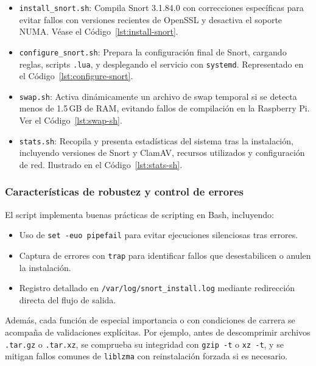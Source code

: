 \documentclass[11pt,a4paper,twoside]{report}
\begin{document}
\begin{itemize}
	\item \texttt{install\_snort.sh}: Compila Snort 3.1.84.0 con correcciones específicas para evitar fallos con versiones recientes de OpenSSL y desactiva el soporte NUMA.  
	Véase el Código~\ref{lst:install-snort}.
	
	\item \texttt{configure\_snort.sh}: Prepara la configuración final de Snort, cargando reglas, scripts \texttt{.lua}, y desplegando el servicio con \texttt{systemd}.  
	Representado en el Código~\ref{lst:configure-snort}.
	
	\item \texttt{swap.sh}: Activa dinámicamente un archivo de swap temporal si se detecta menos de 1.5\,GB de RAM, evitando fallos de compilación en la Raspberry Pi.  
	Ver el Código~\ref{lst:swap-sh}.
	
	\item \texttt{stats.sh}: Recopila y presenta estadísticas del sistema tras la instalación, incluyendo versiones de Snort y ClamAV, recursos utilizados y configuración de red.  
	Ilustrado en el Código~\ref{lst:stats-sh}.
\end{itemize}

\subsubsection{Características de robustez y control de errores}

El script implementa buenas prácticas de scripting en Bash, incluyendo:

\begin{itemize}
	\item Uso de \texttt{set -euo pipefail} para evitar ejecuciones silenciosas tras errores.
	\item Captura de errores con \texttt{trap} para identificar fallos que desestabilicen o anulen la instalación.
	\item Registro detallado en \texttt{/var/log/snort\_install.log} mediante redirección directa del flujo de salida.
\end{itemize}

Además, cada función de especial importancia o con condiciones de carrera se acompaña de validaciones explícitas. Por ejemplo, antes de descomprimir archivos \texttt{.tar.gz} o \texttt{.tar.xz}, se comprueba su integridad con \texttt{gzip -t} o \texttt{xz -t}, y se mitigan fallos comunes de \texttt{liblzma} con reinstalación forzada si es necesario.
\end{document}
